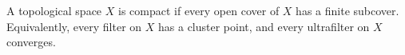 A topological space $X$ is compact if every open cover of $X$ has a finite subcover. Equivalently, every filter on $X$ has a cluster point, and every ultrafilter on $X$ converges.
